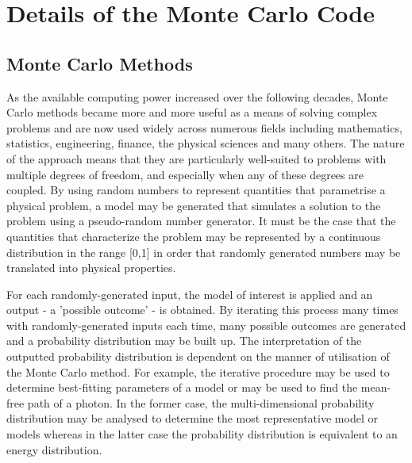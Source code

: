\chapter{Details of the Monte Carlo Code}\label{chp:chp2}

%
%


\section{Monte Carlo Methods}
	 
	 
	 As the available computing power increased over the following decades, Monte Carlo methods became more and more useful as a means of solving complex problems and are now used widely across numerous fields including mathematics, statistics, engineering, finance, the physical sciences and many others.  The nature of the approach means that they are particularly well-suited to problems with multiple degrees of freedom, and especially when any of these degrees are coupled.  By using random numbers to represent quantities that parametrise a physical problem, a model may be generated that simulates a solution to the problem using a pseudo-random number generator.   It must be the case that the quantities that characterize the problem may be represented by a continuous distribution in the range [0,1] in order that randomly generated numbers may be translated into physical properties.  
	 
	 For each randomly-generated input, the model of interest is applied and an output - a 'possible outcome' - is obtained.  By iterating this process many times with randomly-generated inputs each time, many possible outcomes are generated and a probability distribution may be built up.  The interpretation of the outputted probability distribution is dependent on the manner of utilisation of the Monte Carlo method.  For example, the iterative procedure may be used to determine best-fitting parameters of a model or may be used to find the mean-free path of a photon.  In the former case, the multi-dimensional probability distribution may be analysed to determine the most representative model or models whereas in the latter case the probability distribution is equivalent to an energy distribution.
	 
